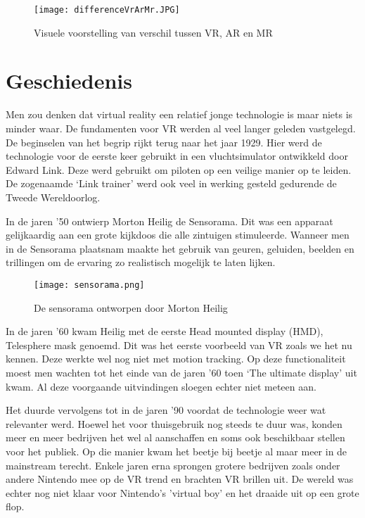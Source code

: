 \begin{figure}[h]
	\centering
	\texttt{[image: differenceVrArMr.JPG]}
	\caption{Visuele voorstelling van verschil tussen VR, AR en MR}
\end{figure}

\section{Geschiedenis}

Men zou denken dat virtual reality een relatief jonge technologie is maar niets is minder waar. De fundamenten voor VR werden al veel langer geleden vastgelegd. De beginselen van het begrip rijkt terug naar het jaar 1929. Hier werd de technologie voor de eerste keer gebruikt in een vluchtsimulator ontwikkeld door Edward Link. Deze werd gebruikt om piloten op een veilige manier op te leiden. De zogenaamde ‘Link trainer’ werd ook veel in werking gesteld gedurende de Tweede Wereldoorlog.


In de jaren ’50 ontwierp Morton Heilig de Sensorama. Dit was een apparaat gelijkaardig aan een grote kijkdoos die alle zintuigen stimuleerde. Wanneer men in de Sensorama plaatsnam maakte het gebruik van geuren, geluiden, beelden en trillingen om de ervaring zo realistisch mogelijk te laten lijken. 

\begin{figure}[h]
	\centering
	\texttt{[image: sensorama.png]}
	\caption{De sensorama ontworpen door Morton Heilig}
\end{figure}

In de jaren ’60 kwam Heilig met de eerste Head mounted display (HMD), Telesphere mask genoemd. Dit was het eerste voorbeeld van VR zoals we het nu kennen. Deze werkte wel nog niet met motion tracking.
Op deze functionaliteit moest men wachten tot het einde van de jaren ’60 toen ‘The ultimate display’ uit kwam.
Al deze voorgaande uitvindingen sloegen echter niet meteen aan.

Het duurde vervolgens tot in de jaren ’90 voordat de technologie weer wat relevanter werd. Hoewel het voor thuisgebruik nog steeds te duur was, konden meer en meer bedrijven het wel al aanschaffen en soms ook beschikbaar stellen voor het publiek. Op die manier kwam het beetje bij beetje al maar meer in de mainstream terecht. Enkele jaren erna sprongen grotere bedrijven zoals onder andere Nintendo mee op de VR trend en brachten VR brillen uit. De wereld was echter nog niet klaar voor Nintendo's 'virtual boy' en het draaide uit op een grote flop. 

